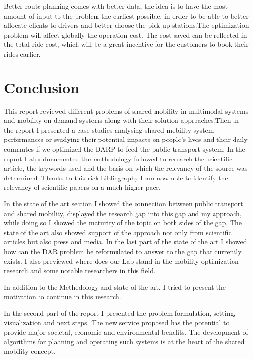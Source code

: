 \documentclass{article}
\begin{document}
Better route planning comes with better data, the idea is to have the most amount of input to the problem the earliest possible, in order to be able to better allocate clients to drivers and better choose the pick up stations.The optimization problem will affect globally the operation cost. The cost saved can be reflected in the total ride cost, which will be a great incentive for the customers to book their rides earlier.


\section{Conclusion}
\label{sec:conclusion}

This report reviewed different problems of shared mobility in multimodal systems and mobility on demand systems along with their solution approaches.Then in the report I presented a case studies 
analysing shared mobility system performances or studying their potential impacts on people’s lives and their daily commutes if we optimized the DARP to feed the public transport system.
In the report I also documented the methodology followed to research the scientific article, the keywords used and the basis on which the relevancy of the source was determined. Thanks to this rich bibliography I am now able to identify the relevancy of scientific 
papers on a much higher pace.

In the state of the art section I showed the connection between public transport and shared mobility, displayed the research gap into this gap and my approach, while doing so I showed the maturity of the topic on both sides of the gap. The state of the art also showed support of the approach not only from scientific articles but also press and media. In the last part of the state of the art I showed how can the DAR problem be reformulated to answer to the gap that currently exists. I also previewed where does our Lab stand in the mobility optimization research and some notable researchers in this field.

In addition to the Methodology and state of the art. I tried to present the motivation to continue in this research. 

In the second part of the report I presented the problem formulation, setting, visualization and next steps.  The new service proposed has the potential to provide major societal, economic and environmental benefits. The development of algorithms for planning and
operating such systems is at the heart of the shared mobility concept. 
\end{document}
